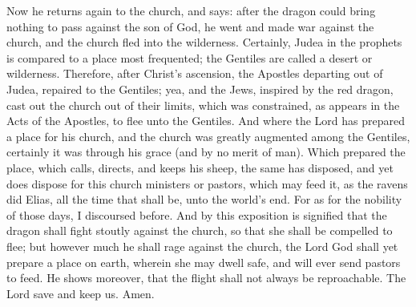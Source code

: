 Now he returns again to the church, and says: after the dragon could bring nothing to pass against the son of God, he went and made war against the church, and the church fled into the wilderness. Certainly, Judea in the prophets is compared to a place most frequented; the Gentiles are called a desert or wilderness. Therefore, after Christ’s ascension, the Apostles departing out of Judea, repaired to the Gentiles; yea, and the Jews, inspired by the red dragon, cast out the church out of their limits, which was constrained, as appears in the Acts of the Apostles, to flee unto the Gentiles. And where the Lord has prepared a place for his church, and the church was greatly augmented among the Gentiles, certainly it was through his grace (and by no merit of man). Which prepared the place, which calls, directs, and keeps his sheep, the same has disposed, and yet does dispose for this church ministers or pastors, which may feed it, as the ravens did Elias, all the time that shall be, unto the world’s end. For as for the nobility of those days, I discoursed before. And by this exposition is signified that the dragon shall fight stoutly against the church, so that she shall be compelled to flee; but however much he shall rage against the church, the Lord God shall yet prepare a place on earth, wherein she may dwell safe, and will ever send pastors to feed. He shows moreover, that the flight shall not always be reproachable. The Lord save and keep us. Amen.
